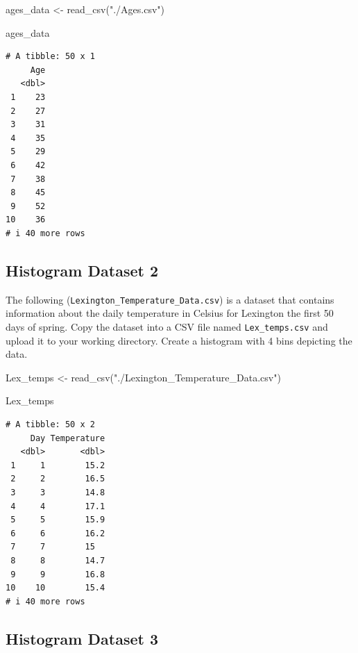 \documentclass[
  letterpaper,
  DIV=11,
  numbers=noendperiod]{scrreprt}
\newenvironment{Shaded}{\begin{snugshade}}{\end{snugshade}}
\newcommand{\FunctionTok}[1]{\textcolor[rgb]{0.28,0.35,0.67}{#1}}
\newcommand{\NormalTok}[1]{\textcolor[rgb]{0.00,0.23,0.31}{#1}}
\newcommand{\OtherTok}[1]{\textcolor[rgb]{0.00,0.23,0.31}{#1}}
\newcommand{\StringTok}[1]{\textcolor[rgb]{0.13,0.47,0.30}{#1}}
\begin{document}
\begin{Shaded}
\begin{Highlighting}[]
\NormalTok{ages\_data }\OtherTok{\textless{}{-}} \FunctionTok{read\_csv}\NormalTok{(}\StringTok{"./Ages.csv"}\NormalTok{)}

\NormalTok{ages\_data}
\end{Highlighting}
\end{Shaded}

\begin{verbatim}
# A tibble: 50 x 1
     Age
   <dbl>
 1    23
 2    27
 3    31
 4    35
 5    29
 6    42
 7    38
 8    45
 9    52
10    36
# i 40 more rows
\end{verbatim}

\subsection*{Histogram Dataset 2}\label{histogram-dataset-2}

The following (\texttt{Lexington\_Temperature\_Data.csv}) is a dataset
that contains information about the daily temperature in Celsius for
Lexington the first 50 days of spring. Copy the dataset into a CSV file
named \texttt{Lex\_temps.csv} and upload it to your working directory.
Create a histogram with 4 bins depicting the data.

\begin{Shaded}
\begin{Highlighting}[]
\NormalTok{Lex\_temps }\OtherTok{\textless{}{-}} \FunctionTok{read\_csv}\NormalTok{(}\StringTok{"./Lexington\_Temperature\_Data.csv"}\NormalTok{)}

\NormalTok{Lex\_temps}
\end{Highlighting}
\end{Shaded}

\begin{verbatim}
# A tibble: 50 x 2
     Day Temperature
   <dbl>       <dbl>
 1     1        15.2
 2     2        16.5
 3     3        14.8
 4     4        17.1
 5     5        15.9
 6     6        16.2
 7     7        15  
 8     8        14.7
 9     9        16.8
10    10        15.4
# i 40 more rows
\end{verbatim}

\subsection*{Histogram Dataset 3}\label{histogram-dataset-3}
\end{document}
